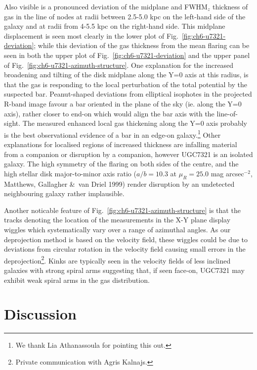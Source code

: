\documentclass[traditabstract]{aa} %
\newcommand\magarcsecsq{mag arcsec$^{-2}$}
\begin{document}
Also visible is a pronounced deviation of the midplane and
FWHM$_z$ thickness of gas in the line of nodes at radii between
2.5-5.0 kpc on the left-hand side of the galaxy and at radii from 4-5.5
kpc on the right-hand side. This midplane displacement is seen most clearly
in the lower plot of Fig.~\ref{fig:ch6-u7321-deviation}; while this
deviation of the gas thickness from the mean flaring can be seen in
both the upper plot of Fig.~\ref{fig:ch6-u7321-deviation} and the
upper panel of Fig.~\ref{fig:ch6-u7321-azimuth-structure}. One
explanation for the increased broadening and tilting of the disk
midplane along the Y=0 axis at this radius, is that the gas is
responding to the local perturbation of the total potential by the
suspected bar. Peanut-shaped deviations from elliptical isophotes in
the projected R-band image \citep{pbld2003} favour a bar oriented in the
plane of the sky (ie. along the Y=0 axis), rather closer to end-on
which would align the bar axis with the line-of-sight.  The measured 
enhanced local gas thickening along the Y=0 axis 
probably is the best observational evidence of
a bar in an edge-on galaxy.\footnote{We thank Lia Athanassoula for
pointing this out.} Other explanations for localised regions
of increased thickness are infalling material from a companion or
disruption by a companion, however UGC7321 is an isolated galaxy.  The
high symmetry of the flaring on both sides of the centre, and the high
stellar disk major-to-minor axis ratio ($a/b=10.3$ at $\mu_R=25.0$
\magarcsecsq, Matthews, Gallagher \&\ van Driel 1999) 
render disruption by an undetected neighbouring galaxy rather implausible.

Another noticable feature of
Fig.~\ref{fig:ch6-u7321-azimuth-structure} is that the tracks
denoting the location of the measurements in the X-Y plane display
wiggles which systematically vary over a range of azimuthal angles.
As our deprojection method is
based on the velocity field, these wiggles could be due to deviations
from circular rotation in the velocity field causing small errors in
the deprojection\footnote{Private communication with Agris Kalnajs.}. 
Kinks are typically seen in the velocity fields
of less inclined galaxies with strong spiral arms \citep[e.g.
M81,][]{rots1974} suggesting that, if seen face-on, UGC7321 may
exhibit weak spiral arms in the gas distribution.



\section{Discussion}
\label{sec:ch5-disc}
\end{document}
